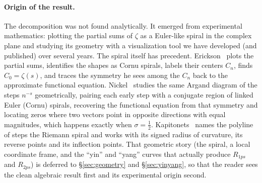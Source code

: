 \documentclass[11pt]{article}
\theoremstyle{definition}
\begin{document}
\paragraph{Origin of the result.} The decomposition was not found analytically.
It emerged from experimental mathematics: plotting the partial sums of $\zeta$ as
a Euler-like spiral in the complex plane and studying its geometry with a
visualization tool we have developed (and published) over several years. The
spiral itself has precedent. Erickson~\cite{Erickson2005} plots the partial
sums, identifies the shapes as Cornu spirals, labels their centers $C_n$, finds
$C_0=\zeta(s)$, and traces the symmetry he sees among the $C_n$ back to the
approximate functional equation. Nickel~\cite{Nickel2013,Nickel2015} studies the
same Argand
diagram of the steps $n^{-s}$ geometrically, pairing each early step with a
conjugate region of linked Euler (Cornu) spirals, recovering the functional
equation from that symmetry and locating zeros where two vectors point in
opposite directions with equal magnitudes, which happens exactly when
$\sigma=\tfrac12$. Kapitonets~\cite{Kapitonets2019} names the polyline of steps
the Riemann spiral and works with its signed radius of curvature, its reverse
points and its inflection points. That
geometric story (the spiral, a local coordinate frame, and the ``yin'' and
``yang'' curves that actually produce $R_{1ps}$ and $R_{2ps}$) is deferred to
\S\ref{sec:geometry} and \S\ref{sec:yinyang}, so that the reader sees the clean
algebraic result first and its experimental origin second.
\end{document}

